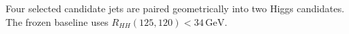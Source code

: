 Four selected candidate jets are paired geometrically into two Higgs candidates. The frozen baseline uses $R_{HH}(125,120)<34\,\mathrm{GeV}$.
